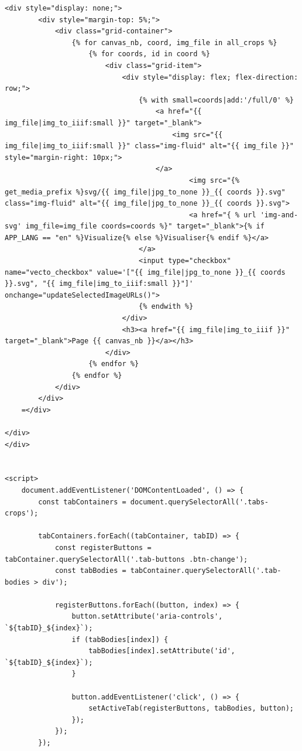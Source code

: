 \begin{lstlisting}[language=HTML5, frame=single, breaklines=true, caption={Template \html pour afficher les extractions et leurs vectorisations.}]
    <div style="display: none;">
        <div style="margin-top: 5%;">
            <div class="grid-container">
                {% for canvas_nb, coord, img_file in all_crops %}
                    {% for coords, id in coord %}
                        <div class="grid-item">
                            <div style="display: flex; flex-direction: row;">
                                {% with small=coords|add:'/full/0' %}
                                    <a href="{{ img_file|img_to_iiif:small }}" target="_blank">
                                        <img src="{{ img_file|img_to_iiif:small }}" class="img-fluid" alt="{{ img_file }}" style="margin-right: 10px;">
                                    </a>
                                            <img src="{% get_media_prefix %}svg/{{ img_file|jpg_to_none }}_{{ coords }}.svg" class="img-fluid" alt="{{ img_file|jpg_to_none }}_{{ coords }}.svg">
                                            <a href="{ % url 'img-and-svg' img_file=img_file coords=coords %}" target="_blank">{% if APP_LANG == "en" %}Visualize{% else %}Visualiser{% endif %}</a>
                                </a>
                                <input type="checkbox" name="vecto_checkbox" value='["{{ img_file|jpg_to_none }}_{{ coords }}.svg", "{{ img_file|img_to_iiif:small }}"]' onchange="updateSelectedImageURLs()">
                                {% endwith %}
                            </div>
                            <h3><a href="{{ img_file|img_to_iiif }}" target="_blank">Page {{ canvas_nb }}</a></h3>
                        </div>
                    {% endfor %}
                {% endfor %}
            </div>
        </div>
    =</div>

</div>
</div>


<script>
    document.addEventListener('DOMContentLoaded', () => {
        const tabContainers = document.querySelectorAll('.tabs-crops');

        tabContainers.forEach((tabContainer, tabID) => {
            const registerButtons = tabContainer.querySelectorAll('.tab-buttons .btn-change');
            const tabBodies = tabContainer.querySelectorAll('.tab-bodies > div');

            registerButtons.forEach((button, index) => {
                button.setAttribute('aria-controls', `${tabID}_${index}`);
                if (tabBodies[index]) {
                    tabBodies[index].setAttribute('id', `${tabID}_${index}`);
                }

                button.addEventListener('click', () => {
                    setActiveTab(registerButtons, tabBodies, button);
                });
            });
        });


\end{lstlisting}
